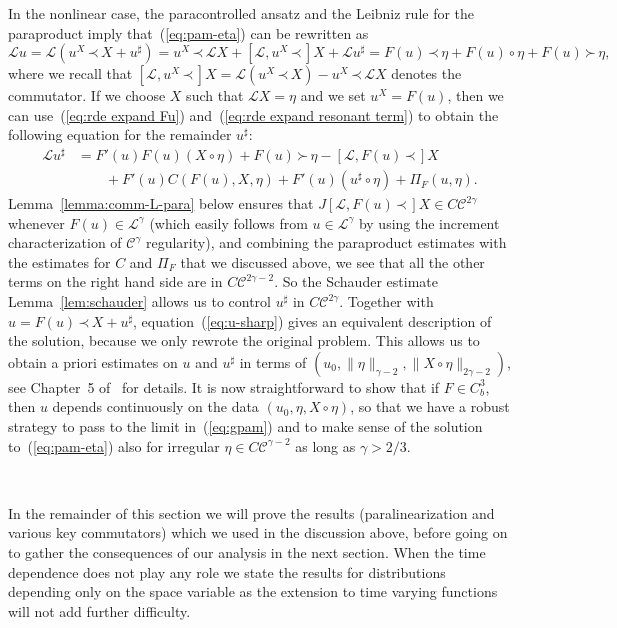 \documentclass[a4paper,11pt]{article}
\newcommand{\LL}{\mathscr{L}}
\newcommand{\CC}{\mathscr{C}}
\newcommand{\lpara}{\,\mathord{\prec}\,}
\newcommand{\rpara}{\,\mathord{\succ}\,}
\newcommand{\reso}{\,\mathord{\circ}\,}
\begin{document}
In the nonlinear case, the paracontrolled ansatz and the Leibniz rule for the
paraproduct imply that~(\ref{eq:pam-eta}) can be rewritten as
\[
   \LL u = \LL (u^X \lpara X + u^{\sharp}) = u^X \lpara \LL X + [ \LL, u^X \lpara ] X + \LL u^{\sharp} = F (u) \lpara \eta + F (u) \reso \eta + F(u) \rpara \eta,
\]
where we recall that $[ \LL, u^X \lpara ] X = \LL (u^X \lpara X) -
u^X \lpara \LL X$ denotes the commutator. If we choose $X$ such that $\LL X =
\eta$ and we set $u^X = F (u)$, then we can use~(\ref{eq:rde expand Fu})
and~(\ref{eq:rde expand resonant term}) to obtain the following equation for
the remainder $u^{\sharp}$:
\begin{equation}
  \begin{array}{ll}
    \LL u^{\sharp} & = F' (u) F (u)  (X \reso \eta) + F (u) \rpara \eta -
    [ \LL, F (u) \lpara ] X\\
    & \hspace{2em} + F' (u) C (F (u), X, \eta) + F' (u)  (u^{\sharp} \reso
    \eta) + \Pi_F (u, \eta) .
  \end{array} \label{eq:u-sharp}
\end{equation}
Lemma~\ref{lemma:comm-L-para} below ensures that $J [ \LL, F (u)
\lpara ] X \in C \CC^{2 \gamma}$ whenever $F(u) \in \LL^{\gamma}$ (which easily follows from $u \in \LL^\gamma$ by using the increment characterization of $\CC^\gamma$ regularity), and combining the paraproduct estimates with the estimates for $C$ and $\Pi_F$ that we discussed above, we see that all the other terms on the right hand side are in $C
\CC^{2 \gamma - 2}$. So the Schauder estimate Lemma~\ref{lem:schauder} allows us to control $u^{\sharp}$ in $C
\CC^{2 \gamma}$. Together with $u = F (u) \lpara X + u^{\sharp}$,
equation~(\ref{eq:u-sharp}) gives an equivalent description of the solution, because we only rewrote the original problem. This allows us to obtain a priori estimates on $u$ and $u^{\sharp}$ in terms of
$(u_0, \| \eta \|_{\gamma - 2}, \|X \reso \eta \|_{2 \gamma - 2})$, see Chapter~5 of~\cite{Gubinelli2012} for details. It is now
straightforward to show that if $F \in C^3_b$, then $u$ depends continuously on the data
$(u_0, \eta, X \reso \eta)$, so that we have a robust strategy to pass to the
limit in~(\ref{eq:gpam}) and to make sense of the solution
to~(\ref{eq:pam-eta}) also for irregular $\eta \in C \CC^{\gamma - 2}$ as long
as $\gamma > 2 / 3$.

\

In the remainder of this section we will prove the results (paralinearization
and various key commutators) which we used in the discussion above, before
going on to gather the consequences of our analysis in the next section. When
the time dependence does not play any role we state the results for
distributions depending only on the space variable as the extension to time
varying functions will not add further difficulty.
\end{document}
